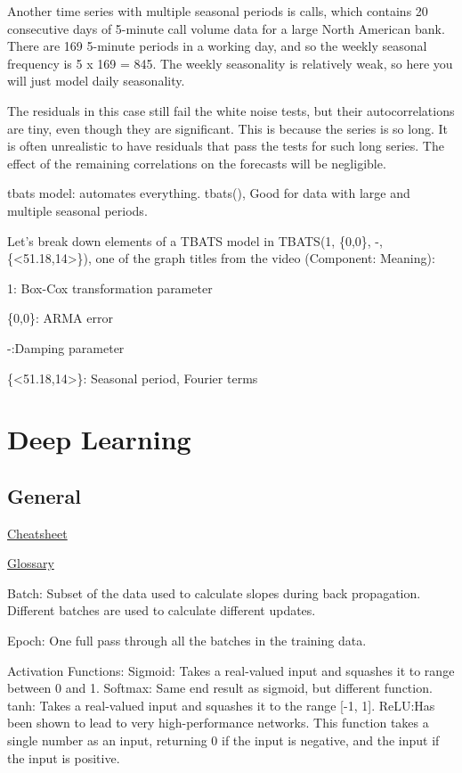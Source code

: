 \documentclass[]{book}
\begin{document}
Another time series with multiple seasonal periods is calls, which
contains 20 consecutive days of 5-minute call volume data for a large
North American bank. There are 169 5-minute periods in a working day,
and so the weekly seasonal frequency is 5 x 169 = 845. The weekly
seasonality is relatively weak, so here you will just model daily
seasonality.

The residuals in this case still fail the white noise tests, but their
autocorrelations are tiny, even though they are significant. This is
because the series is so long. It is often unrealistic to have residuals
that pass the tests for such long series. The effect of the remaining
correlations on the forecasts will be negligible.

tbats model: automates everything. tbats(), Good for data with large and
multiple seasonal periods.

Let's break down elements of a TBATS model in TBATS(1, \{0,0\}, -,
\{\textless{}51.18,14\textgreater{}\}), one of the graph titles from the
video (Component: Meaning):

1: Box-Cox transformation parameter

\{0,0\}: ARMA error

-:Damping parameter

\{\textless{}51.18,14\textgreater{}\}: Seasonal period, Fourier terms

\chapter{Deep Learning}\label{deep-learning}

\section{General}\label{general-8}

\href{https://stanford.edu/~shervine/teaching/cs-229/cheatsheet-deep-learning}{Cheatsheet}

\href{http://www.wildml.com/deep-learning-glossary/}{Glossary}

Batch: Subset of the data used to calculate slopes during back
propagation. Different batches are used to calculate different updates.

Epoch: One full pass through all the batches in the training data.

Activation Functions: Sigmoid: Takes a real-valued input and squashes it
to range between 0 and 1. Softmax: Same end result as sigmoid, but
different function. tanh: Takes a real-valued input and squashes it to
the range {[}-1, 1{]}. ReLU:Has been shown to lead to very
high-performance networks. This function takes a single number as an
input, returning 0 if the input is negative, and the input if the input
is positive.
\end{document}
